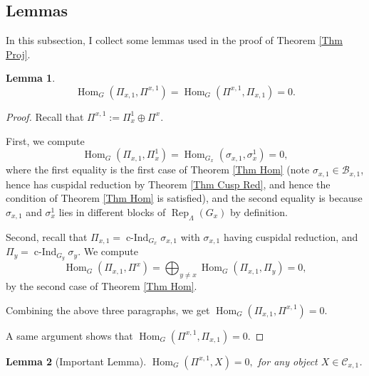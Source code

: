 \documentclass{article}
\newtheorem{lemma}{Lemma}
\DeclareMathOperator{\cInd}{\operatorname{c-Ind}}
\newcommand{\Hom}{\operatorname{Hom}}
\newcommand{\Rep}{\operatorname{Rep}}
\begin{document}
	\subsection{Lemmas}
	
	In this subsection, I collect some lemmas used in the proof of Theorem \ref{Thm Proj}.
	

	
	\begin{lemma}\label{Lem Ortho}
		$$\Hom_G(\Pi_{x,1}, \Pi^{x,1})=\Hom_G(\Pi^{x,1}, \Pi_{x,1})=0.$$
	\end{lemma}
	
	\begin{proof}
		Recall that
		$\Pi^{x,1}:=\Pi_x^1 \oplus \Pi^x$.
		
		First, we compute
		$$\Hom_G(\Pi_{x,1}, \Pi_x^1)=\Hom_{G_x}(\sigma_{x,1}, \sigma_x^1)=0,$$
		where the first equality is the first case of Theorem \ref{Thm Hom} (note $\sigma_{x,1} \in \mathcal{B}_{x,1}$, hence has cuspidal reduction by Theorem \ref{Thm Cusp Red}, and hence the condition of Theorem \ref{Thm Hom} is satisfied), and the second equality is because $\sigma_{x,1}$ and $\sigma_x^1$ lies in different blocks of $\Rep_{\Lambda}(G_x)$ by definition.
		
		Second, recall that $\Pi_{x,1}=\cInd_{G_x}\sigma_{x,1}$ with $\sigma_{x,1}$ having cuspidal reduction, and $\Pi_y=\cInd_{G_y}\sigma_y$. We compute 
		$$\Hom_G(\Pi_{x,1}, \Pi^x)=\bigoplus_{y \neq x}\Hom_G(\Pi_{x,1}, \Pi_y)=0,$$
		by the second case of Theorem \ref{Thm Hom}.
		
		Combining the above three paragraphs, we get $\Hom_G(\Pi_{x,1}, \Pi^{x,1})=0$.
		
		A same argument shows that $\Hom_G(\Pi^{x,1}, \Pi_{x,1})=0$.
	\end{proof}
	
	\begin{lemma}[Important Lemma]\label{Lem Gen}
		$\Hom_G(\Pi^{x,1}, X)=0,$
		for any object $X \in \mathcal{C}_{x,1}$.
	\end{lemma}
	
\end{document}
